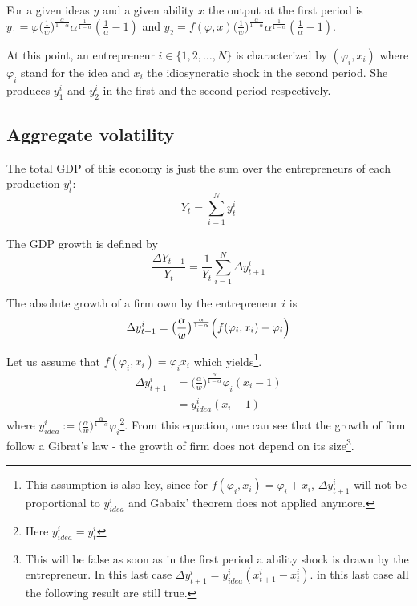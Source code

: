 \documentclass[12pt]{article}
\begin{document}
For a given ideas $y$ and a given ability $x$ the output at the first period is $y_1 = \varphi \big( \frac{1}{w} \big)^{\frac{\alpha}{1-\alpha}} \alpha^{\frac{1}{1-\alpha}} (\frac{1}{\alpha}-1)$ and $y_2 = f(\varphi, x) \big( \frac{1}{w} \big)^{\frac{\alpha}{1-\alpha}} \alpha^{\frac{1}{1-\alpha}} (\frac{1}{\alpha}-1)$.

At this point, an entrepreneur $i\in \{1,2,\ldots, N\}$ is characterized by $(\varphi_i,x_i)$ where $\varphi_i$ stand for the idea and $x_i$ the idiosyncratic shock in the second period. She produces $y_1^i$ and $y_2^i$ in the first and the second period respectively.

\subsection{Aggregate volatility}

The total GDP of this economy is just the sum over the entrepreneurs of each production $y_t^i$:
\begin{equation*}
 Y_t = \sum_{i=1}^N y_t^i
\end{equation*}


The GDP growth is defined by
\begin{equation}
\label{GDP}
\frac{\Delta Y_{t+1}}{Y_t} = \frac{1}{Y_t} \sum_{i=1}^N  \Delta y^i_{t+1}
\end{equation}

The absolute growth of a firm own by the entrepreneur $i$ is 
\begin{equation*}
\Delta y^i_{t+1}=  \big( \frac{\alpha}{w} \big)^{\frac{\alpha}{1-\alpha}} \Big(  f(\varphi_i,x_i) -\varphi_i \Big)\\
\end{equation*}

Let us assume that $f(\varphi_i,x_i) = \varphi_i  x_i$ which yields\footnote{This assumption is also key, since for $f(\varphi_i,x_i) = \varphi_i + x_i$, $\Delta y^i_{t+1}$ will not be proportional to $y^i_{idea}$ and Gabaix' theorem does not applied anymore.}.
\begin{align*}
\Delta y^i_{t+1}&=  \Big( \frac{\alpha}{w} \Big)^{\frac{\alpha}{1-\alpha}} \varphi_i ( x_i - 1 )\\
 &= y^i_{idea} ( x_i - 1 )
\end{align*}
where $y^i_{idea} := \Big( \frac{\alpha}{w} \Big)^{\frac{\alpha}{1-\alpha}} \varphi_i$\footnote{Here $ y^i_{idea}= y^i_t$}. From this equation, one can see that the growth of firm follow a Gibrat's law - the growth of firm does not depend on its size\footnote{This will be false as soon as in the first period a ability shock is drawn by the entrepreneur. In this last case $\Delta y^i_{t+1} = y^i_{idea} ( x^i_{t+1} - x^i_t )$. in this last case all the following result are still true.}.
\end{document}
